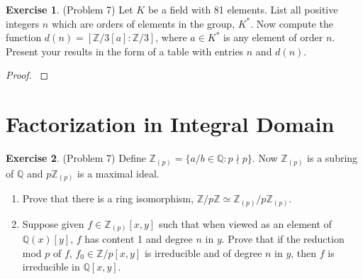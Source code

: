 \documentclass[12pt, psamsfonts]{amsart}
\theoremstyle{definition}
\newtheorem*{exer}{Exercise}
\theoremstyle{remark}
\numberwithin{equation}{section}
\begin{document}
\begin{exer}{(Problem 7)}
  Let $K$ be a field with 81 elements.
  List all positive integers $n$ which are orders of elements in the group, $K^*$.
  Now compute the function $d(n) = [\mathbb{Z}/3[a]:\mathbb{Z}/3]$, where $a \in K^*$ is any element of order $n$.
  Present your results in the form of a table with entries $n$ and $d(n)$.
\end{exer}

\begin{proof}
  $ $
\end{proof}

\section{Factorization in Integral Domain}

\begin{exer}{(Problem 7)}
  Define $\mathbb{Z}_{(p)} = \{ a / b \in \mathbb{Q} : p \nmid p \}$.
  Now $\mathbb{Z}_{(p)}$ is a subring of $\mathbb{Q}$ and $p\mathbb{Z}_{(p)}$ is a maximal ideal.
  \begin{enumerate}[label=(\roman*)]
    \item
      Prove that there is a ring isomorphism, $\mathbb{Z}/p\mathbb{Z} \simeq \mathbb{Z}_{(p)} / p\mathbb{Z}_{(p)}$.
    \item
      Suppose given $f \in \mathbb{Z}_{(p)}[x, y]$ such that when viewed as an element of $\mathbb{Q}(x)[y]$, $f$ has content 1 and degree $n$ in $y$.
      Prove that if the reduction mod $p$ of $f$, $f_0 \in \mathbb{Z}/p[x, y]$ is irreducible and of degree $n$ in $y$, then $f$ is irreducible in $\mathbb{Q}[x, y]$.
  \end{enumerate}
\end{exer}
\end{document}
